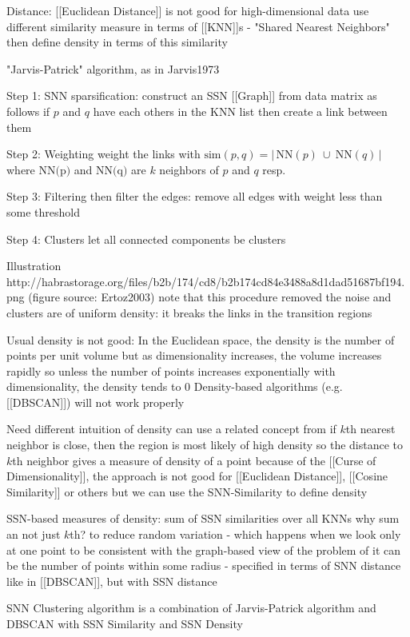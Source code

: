 Distance:
 [[Euclidean Distance]] is not good for high-dimensional data
 use different similarity measure in terms of [[KNN]]s - "Shared Nearest Neighbors"
 then define density in terms of this similarity


"Jarvis-Patrick" algorithm, as in Jarvis1973


Step 1: SNN sparsification:
 construct an SSN [[Graph]] from data matrix as follows
 if $p$ and $q$ have each others in the KNN list
 then create a link between them


Step 2: Weighting
 weight the links with $\text{sim}(p, q) = \big| \, \text{NN}(p) \ \cup \ \text{NN}(q) \, \big|$
 where $\text{NN(p)}$ and $\text{NN(q)}$ are $k$ neighbors of $p$ and $q$ resp.


Step 3: Filtering
 then filter the edges:
 remove all edges with weight less than some threshold


Step 4: Clusters
 let all connected components be clusters


Illustration
 http://habrastorage.org/files/b2b/174/cd8/b2b174cd84e3488a8d1dad51687bf194.png
 (figure source: Ertoz2003)
 note that this procedure removed the noise
 and clusters are of uniform density: it breaks the links in the transition regions


Usual density is not good:
 In the Euclidean space, the density is the number of points per unit volume
 but as dimensionality increases, the volume increases rapidly
 so unless the number of points increases exponentially with dimensionality, the density tends to 0
 Density-based algorithms (e.g. [[DBSCAN]]) will not work properly


Need different intuition of density
 can use a related concept from
 if $k$th nearest neighbor is close, then the region is most likely of high density
 so the distance to $k$th neighbor gives a measure of density of a point
 because of the [[Curse of Dimensionality]], the approach is not good for [[Euclidean Distance]], [[Cosine Similarity]] or others
 but we can use the SNN-Similarity to define density


SSN-based measures of density:
 sum of SSN similarities over all KNNs
 why sum an not just $k$th?
 to reduce random variation - which happens when we look only at one point
 to be consistent with the graph-based view of the problem
 of it can be the number of points within some radius - specified in terms of SNN distance
 like in [[DBSCAN]], but with SSN distance


SNN Clustering algorithm is a combination of
 Jarvis-Patrick algorithm and
 DBSCAN with SSN Similarity and SSN Density


